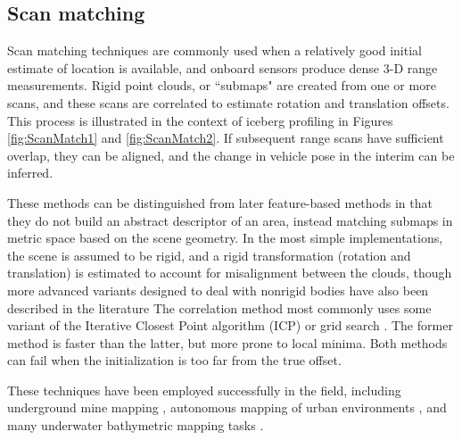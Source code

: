\subsection{Scan matching}

Scan matching techniques are commonly used when a relatively good initial estimate of location is available, and onboard sensors produce dense 3-D range measurements. Rigid point clouds, or ``submaps" are created from one or more scans, and these scans are correlated to estimate rotation and translation offsets. This process is illustrated in the context of iceberg profiling in Figures \ref{fig:ScanMatch1} and \ref{fig:ScanMatch2}. If subsequent range scans have sufficient overlap, they can be aligned, and the change in vehicle pose in the interim can be inferred. 

These methods can be distinguished from later feature-based methods in that they do not build an abstract descriptor of an area, instead matching submaps in metric space based on the scene geometry. In the most simple implementations, the scene is assumed to be rigid, and a rigid transformation (rotation and translation) is estimated to account for misalignment between the clouds, though more advanced variants designed to deal with nonrigid bodies have also been described in the literature \cite{Amberg2007, Feldmar1996,Haehnel2003} The correlation method most commonly uses some variant of the Iterative Closest Point algorithm (ICP) \cite{Besl1992} or grid search \cite{Miller2013}. The former method is faster than the latter, but more prone to local minima. Both methods can fail when the initialization is too far from the true offset. 

These techniques have been employed successfully in the field, including underground mine mapping \cite{Bosse2003}, autonomous mapping of urban environments \cite{Thrun2006}, and many underwater bathymetric mapping tasks \cite{Caress2008}.

